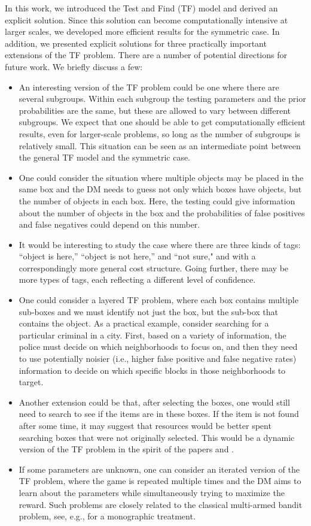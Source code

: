 \documentclass[a4paper,11pt]{article}
\begin{document}
In this work, we introduced the Test and Find (TF) model and derived an explicit solution. Since this solution can become computationally intensive at larger scales, we developed more efficient results for the symmetric case. In addition, we presented explicit solutions for three practically important extensions of the TF problem. There are a number of potential directions for future work. We briefly discuss a few:
\begin{itemize}
\item An interesting version of  the TF problem could be one where there are several subgroups. Within each subgroup the testing parameters and the prior probabilities are the same, but these are allowed to vary between different subgroups. We expect that one should be able to get computationally efficient results, even for larger-scale problems, so long as the number of subgroups is relatively small. This situation can be seen as an intermediate point between the general TF model and the symmetric case.
\item One could consider the situation where multiple objects may be placed in the same box and the DM needs to guess not only which boxes have objects, but the number of objects in each box. Here, the testing could give information about the number of objects in the box and the probabilities of false positives and false negatives could depend on this number.
\item It would be interesting to study the case where there are  three kinds of tags: ``object is here,'' ``object is not here,'' and ``not sure," and with a correspondingly more general cost structure. Going further, there may be more types of tags, each reflecting a different level of confidence. 
\item One could consider a layered TF problem, where each box contains multiple sub-boxes and we must identify not just the box, but the sub-box that contains the object. As a practical example, consider searching for a particular criminal in a city. First, based on a variety of information, the police must decide on which neighborhoods to focus on, and then they need to use potentially noisier (i.e., higher false positive and false negative rates) information to decide on which specific blocks in those neighborhoods to target.
\item Another extension could be that, after selecting the boxes, one would still need to search to see if the items are in these boxes. If the item is not found after some time, it may suggest that resources would be better spent searching boxes that were not originally selected. This would be a dynamic version of the TF problem in the spirit of the papers  \cite{Arkin:1964a} and \cite{Arkin:1964}. 
\item If some parameters are unknown, one can consider an iterated version of the TF problem, where the game is repeated multiple times and the DM aims to learn about the parameters while simultaneously trying to maximize the reward. Such problems are closely related to the classical multi-armed bandit problem, see, e.g., \cite{prso90} for a monographic treatment.
\end{itemize}
\end{document}
